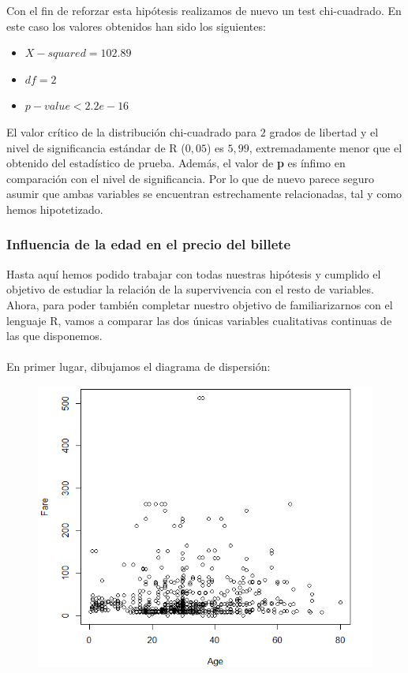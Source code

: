 \documentclass{article}
\begin{document}
\noindent Con el fin de reforzar esta hipótesis realizamos de nuevo un test chi-cuadrado. En este caso los valores obtenidos han sido los siguientes:
\begin{itemize}
    \item $X-squared =102.89 $
    \item $df = 2$
    \item $p-value < 2.2e-16$
\end{itemize}
El valor crítico de la distribución chi-cuadrado para $2$ grados de libertad y el nivel de significancia estándar de R ($0,05$) es $5,99$, extremadamente menor que el obtenido del estadístico de prueba. Además, el valor de \textbf{p} es ínfimo en comparación con el nivel de significancia. Por lo que de nuevo parece seguro asumir que ambas variables se encuentran estrechamente relacionadas, tal y como hemos hipotetizado. 
\newpage
\subsubsection{Influencia de la edad en el precio del billete}
Hasta aquí hemos podido trabajar con todas nuestras hipótesis y cumplido el objetivo de estudiar la relación de la supervivencia con el resto de variables. Ahora, para poder también completar nuestro objetivo de familiarizarnos con el lenguaje R, vamos a comparar las dos únicas variables cualitativas continuas de las que disponemos.\\\\
En primer lugar, dibujamos el diagrama de dispersión:
\begin{figure}[!h]
    \centering
    \includegraphics[width=0.7\linewidth]{content/fare_age.png}
\end{figure}
\end{document}
